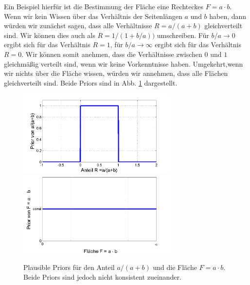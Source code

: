 Ein Beispiel hierfür ist die Bestimmung der Fläche eine Rechteckes $F=a \cdot b$.
Wenn wir kein Wissen über das Verhältnis der Seitenlängen $a$ und $b$
haben, dann würden wir zunächst sagen, dass alle Verhältnisse $R = a/(a+b)$ gleichverteilt sind. Wir können dies auch als $R=1/(1+b/a))$
umschreiben. Für $b/a \rightarrow 0$ ergibt sich für das Verhältnis
$R=1$, für $b/a \rightarrow \infty$ ergibt sich für das Verhältnis
$R=0$. Wir können somit anehmen, dass die Verhältnisse zwischen
$0$ und $1$ gleichmäßig verteilt sind, wenn wir keine Vorkenntnisse
haben.
Umgekehrt,wenn wir nichts über die Fläche wissen, würden wir annehmen, dass alle Flächen gleichverteilt sind. Beide Priors sind in Abb. \ref{fig:Beispiel_Flaechenbestimmung_Verteilungen01} dargestellt.

\begin{figure}[!h]
 	\begin{center}
		\includegraphics[width=80mm]{12_vorlesung_GUMS2/media/prior_des_Anteils_1.png}
		\includegraphics[width=80mm]{12_vorlesung_GUMS2/media/prior_der_Flaeche_1.png}
		\caption{Plausible Priors für den Anteil $a/(a+b)$ und die Fläche $F = a\cdot b.$ Beide Priors sind jedoch nicht konsistent zueinander.}
		\label{fig:Beispiel_Flaechenbestimmung_Verteilungen01}
	\end{center}
\end{figure}

